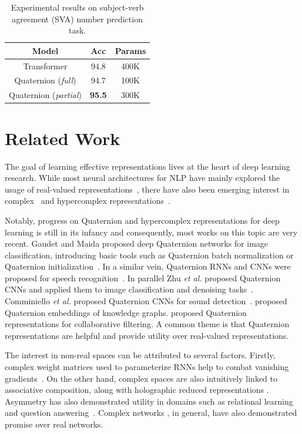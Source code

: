 \documentclass[11pt,a4paper]{article}
\begin{document}
\begin{table}[H]
  \centering
    \begin{tabular}{c|cc}
    \hline
    Model   &  Acc     & Params \\
    \hline
    Transformer & 94.8  & 400K \\
    Quaternion  (\emph{full}) & 94.7 & 100K \\
    Quaternion (\emph{partial}) & \textbf{95.5}  & 300K \\
    \hline
    \end{tabular}%
     \caption{Experimental results on subject-verb agreement (SVA) number prediction task. }
  \label{tab:sva}%
\end{table}%

\section{Related Work}
 The goal of learning effective representations lives at the heart of deep learning research. While most neural architectures for NLP have mainly explored the usage of real-valued representations~\cite{vaswani2017attention,bahdanau2014neural,parikh2016decomposable}, there have also been emerging interest in complex~\cite{danihelka2016associative,arjovsky2016unitary,gaudet2017deep} and hypercomplex representations~\cite{parcollet2018quaternion,parcollet2018quaternion2,gaudet2017deep}.

 Notably, progress on Quaternion and hypercomplex representations for deep learning is still in its infancy and consequently, most works on this topic are very recent.  Gaudet and Maida proposed deep Quaternion networks for image classification, introducing basic tools such as Quaternion batch normalization or Quaternion initialization~\cite{gaudet2017deep}. In a similar vein, Quaternion RNNs and CNNs were proposed for speech recognition~\cite{parcollet2018quaternion2,parcollet2018quaternion}. In parallel Zhu \emph{et al.} proposed Quaternion CNNs and applied them to image classification and denoising tasks~\cite{zhu2018quaternion}. Comminiello \emph{et al.} proposed Quaternion CNNs for sound detection~\cite{comminiello2018quaternion}. \cite{zhang2019quate} proposed Quaternion embeddings of knowledge graphs. \cite{zhang2019quaternion} proposed Quaternion representations for collaborative filtering. A common theme is that Quaternion representations are helpful and provide utility over real-valued representations.

 The interest in non-real spaces can be attributed to several factors. Firstly, complex weight matrices used to parameterize RNNs help to combat vanishing gradients~\cite{arjovsky2016unitary}. On the other hand, complex spaces are also intuitively linked to associative composition, along with holographic reduced representations \cite{plate1991holographic,nickel2016holographic,tay2017learning}. Asymmetry has also demonstrated utility in domains such as relational learning~\cite{trouillon2016complex,nickel2016holographic} and question answering~\cite{tay2018hermitian}. Complex networks \cite{trabelsi2017deep}, in general, have also demonstrated promise over real networks.
\end{document}
